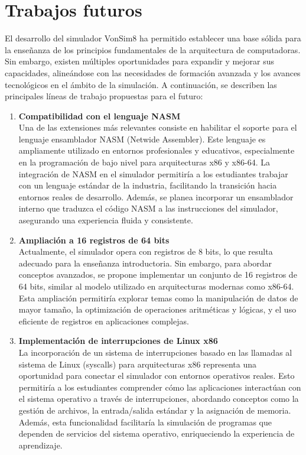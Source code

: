 \documentclass[12pt,oneside]{templates/unerthesis}
\begin{document}
\hypertarget{futuro}{%
\chapter{Trabajos futuros}\label{futuro}}

El desarrollo del simulador VonSim8 ha permitido establecer una base sólida para la enseñanza de los principios fundamentales de la arquitectura de computadoras. Sin embargo, existen múltiples oportunidades para expandir y mejorar sus capacidades, alineándose con las necesidades de formación avanzada y los avances tecnológicos en el ámbito de la simulación. A continuación, se describen las principales líneas de trabajo propuestas para el futuro:

\begin{enumerate}
\def\labelenumi{\arabic{enumi}.}
\item
  \textbf{Compatibilidad con el lenguaje NASM}\\
  Una de las extensiones más relevantes consiste en habilitar el soporte para el lenguaje ensamblador NASM (Netwide Assembler). Este lenguaje es ampliamente utilizado en entornos profesionales y educativos, especialmente en la programación de bajo nivel para arquitecturas x86 y x86-64. La integración de NASM en el simulador permitiría a los estudiantes trabajar con un lenguaje estándar de la industria, facilitando la transición hacia entornos reales de desarrollo. Además, se planea incorporar un ensamblador interno que traduzca el código NASM a las instrucciones del simulador, asegurando una experiencia fluida y consistente.
\item
  \textbf{Ampliación a 16 registros de 64 bits}\\
  Actualmente, el simulador opera con registros de 8 bits, lo que resulta adecuado para la enseñanza introductoria. Sin embargo, para abordar conceptos avanzados, se propone implementar un conjunto de 16 registros de 64 bits, similar al modelo utilizado en arquitecturas modernas como x86-64. Esta ampliación permitiría explorar temas como la manipulación de datos de mayor tamaño, la optimización de operaciones aritméticas y lógicas, y el uso eficiente de registros en aplicaciones complejas.
\item
  \textbf{Implementación de interrupciones de Linux x86}\\
  La incorporación de un sistema de interrupciones basado en las llamadas al sistema de Linux (syscalls) para arquitecturas x86 representa una oportunidad para conectar el simulador con entornos operativos reales. Esto permitiría a los estudiantes comprender cómo las aplicaciones interactúan con el sistema operativo a través de interrupciones, abordando conceptos como la gestión de archivos, la entrada/salida estándar y la asignación de memoria. Además, esta funcionalidad facilitaría la simulación de programas que dependen de servicios del sistema operativo, enriqueciendo la experiencia de aprendizaje.

\end{enumerate}
\end{document}
